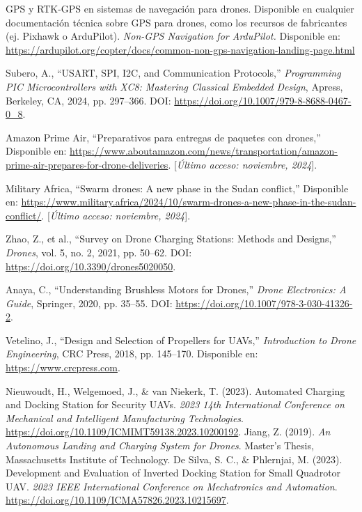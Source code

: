 \begin{thebibliography}{30}
    GPS y RTK-GPS en sistemas de navegación para drones. Disponible en cualquier documentación técnica sobre GPS para drones, como los recursos de fabricantes (ej. Pixhawk o ArduPilot).
        \textit{Non-GPS Navigation for ArduPilot.} Disponible en: \url{https://ardupilot.org/copter/docs/common-non-gps-navigation-landing-page.html}








   
   
    
  
   
   
    Subero, A., ``USART, SPI, I2C, and Communication Protocols,'' \textit{Programming PIC Microcontrollers with XC8: Mastering Classical Embedded Design}, Apress, Berkeley, CA, 2024, pp. 297--366. DOI: \url{https://doi.org/10.1007/979-8-8688-0467-0_8}.

    
   
    Amazon Prime Air, ``Preparativos para entregas de paquetes con drones,'' Disponible en: \url{https://www.aboutamazon.com/news/transportation/amazon-prime-air-prepares-for-drone-deliveries}. [\textit{Último acceso: noviembre, 2024}].
    
    
    Military Africa, ``Swarm drones: A new phase in the Sudan conflict,'' Disponible en: \url{https://www.military.africa/2024/10/swarm-drones-a-new-phase-in-the-sudan-conflict/}. [\textit{Último acceso: noviembre, 2024}].

   
  
  
    Zhao, Z., et al., ``Survey on Drone Charging Stations: Methods and Designs,'' \textit{Drones}, vol. 5, no. 2, 2021, pp. 50--62. DOI: \url{https://doi.org/10.3390/drones5020050}.

    Anaya, C., ``Understanding Brushless Motors for Drones,'' \textit{Drone Electronics: A Guide}, Springer, 2020, pp. 35--55. DOI: \url{https://doi.org/10.1007/978-3-030-41326-2}.

    Vetelino, J., ``Design and Selection of Propellers for UAVs,'' \textit{Introduction to Drone Engineering}, CRC Press, 2018, pp. 145--170. Disponible en: \url{https://www.crcpress.com}.

   

     Nieuwoudt, H., Welgemoed, J., \& van Niekerk, T. (2023). Automated Charging and Docking Station for Security UAVs. \textit{2023 14th International Conference on Mechanical and Intelligent Manufacturing Technologies}. \url{https://doi.org/10.1109/ICMIMT59138.2023.10200192}.
     Jiang, Z. (2019). \textit{An Autonomous Landing and Charging System for Drones}. Master's Thesis, Massachusetts Institute of Technology.
     De Silva, S. C., \& Phlernjai, M. (2023). Development and Evaluation of Inverted Docking Station for Small Quadrotor UAV. \textit{2023 IEEE International Conference on Mechatronics and Automation}. \url{https://doi.org/10.1109/ICMA57826.2023.10215697}.
    
    

\end{thebibliography}

